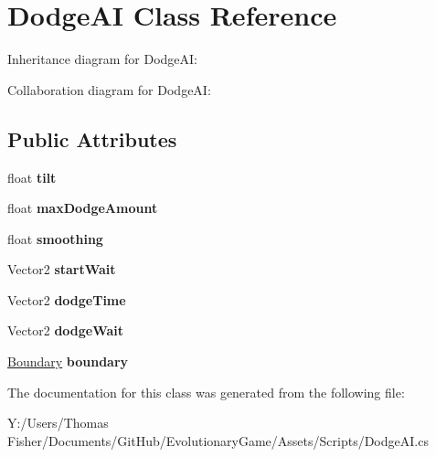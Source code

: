 \hypertarget{class_dodge_a_i}{}\section{Dodge\+AI Class Reference}
\label{class_dodge_a_i}


Inheritance diagram for Dodge\+AI\+:


Collaboration diagram for Dodge\+AI\+:
\subsection*{Public Attributes}
\begin{DoxyCompactItemize}
\item 
\mbox{\label{class_dodge_a_i_aedc8e94ad6e4332b1a7d1e796152cf0a}} 
float {\bfseries tilt}
\item 
\mbox{\label{class_dodge_a_i_ae3a74fed41f444919b11ee60cace7514}} 
float {\bfseries max\+Dodge\+Amount}
\item 
\mbox{\label{class_dodge_a_i_af0a4a558673576582d6bff31c2239489}} 
float {\bfseries smoothing}
\item 
\mbox{\label{class_dodge_a_i_a6754c13da5310c168cf1c1c2a96a7e54}} 
Vector2 {\bfseries start\+Wait}
\item 
\mbox{\label{class_dodge_a_i_ad1cc8757e5e23683a73d8510897fa277}} 
Vector2 {\bfseries dodge\+Time}
\item 
\mbox{\label{class_dodge_a_i_a09b82accde63395584defbf0dc156460}} 
Vector2 {\bfseries dodge\+Wait}
\item 
\mbox{\label{class_dodge_a_i_a1ebd76c246c5f81eb39cad7233a5840d}} 
\mbox{\hyperlink{class_boundary}{Boundary}} {\bfseries boundary}
\end{DoxyCompactItemize}


The documentation for this class was generated from the following file\+:\begin{DoxyCompactItemize}
\item 
Y\+:/\+Users/\+Thomas Fisher/\+Documents/\+Git\+Hub/\+Evolutionary\+Game/\+Assets/\+Scripts/Dodge\+A\+I.\+cs\end{DoxyCompactItemize}
